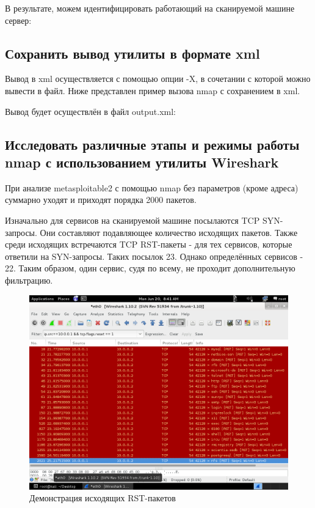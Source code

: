 \documentclass[a4paper]{article}
\begin{document}


В результате, можем идентифицировать работающий на сканируемой машине сервер:



\subsection{Сохранить вывод утилиты в формате xml}

Вывод в xml осуществляется с помощью опции -X, в сочетании с которой можно вывести в файл. Ниже представлен пример вызова nmap с сохранением в xml.



Вывод будет осуществлён в файл output.xml:



\subsection{Исследовать различные этапы и режимы работы nmap с использованием утилиты Wireshark}

При анализе metasploitable2 с помощью nmap без параметров (кроме адреса) суммарно уходят и приходят порядка 2000 пакетов. 

Изначально для сервисов на сканируемой машине посылаются TCP SYN-запросы. Они составляют подавляющее количество исходящих пакетов. Также среди исходящих встречаются TCP RST-пакеты - для тех сервисов, которые ответили на SYN-запросы. Таких посылок 23. Однако определённых сервисов - 22. Таким образом, один сервис, судя по всему, не проходит дополнительную фильтрацию.

\begin{figure}[H]
	\begin{center}
		\includegraphics[scale=0.5]{pics/rst_wireshark.png}
		\caption{Демонстрация исходящих RST-пакетов} 
		\label{pic:pic_name}
	\end{center}
\end{figure}
\end{document}
